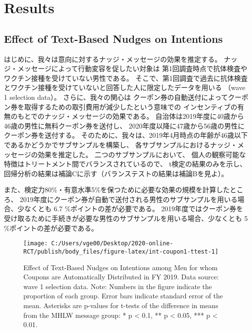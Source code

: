 \documentclass[
  11pt,
  a4paper,
]{article}
\begin{document}
\hypertarget{result}{%
\section{Results}\label{result}}

\hypertarget{intention}{%
\subsection{Effect of Text-Based Nudges on Intentions}\label{intention}}

はじめに、我々は意向に対するナッジ・メッセージの効果を推定する。
ナッジ・メッセージによって行動変容を促したい対象は
第1回調査時点で抗体検査やワクチン接種を受けていない男性である。
そこで、第1回調査で過去に抗体検査とワクチン接種を受けていないと回答した人に限定したデータを用いる
（wave 1 selection data）。
さらに、我々の関心は
クーポン券の自動送付によってクーポン券を取得するための取引費用が減少したという意味での
インセンティブの有無のもとでのナッジ・メッセージの効果である。
自治体は2019年度に40歳から46歳の男性に無料クーポン券を送付し、
2020年度以降に47歳から56歳の男性にクーポン券を送付する。
そのために、我々は、2019年4月時点の年齢が46歳以下であるかどうかでサブサンプルを構築し、
各サブサンプルにおけるナッジ・メッセージの効果を推定した。
二つのサブサンプルにおいて、
個人の観察可能な特徴はトリートメント間でバランスされているので、
t検定の結果のみを示し、回帰分析の結果は補論Cに示す（バランステストの結果は補論Bを見よ）。

また、検定力80\%・有意水準5\%を保つために必要な効果の規模を計算したところ、
2019年度にクーポン券が自動で送付される男性のサブサンプルを用いる場合、少なくとも
6.7
\%ポイントの差が必要である。
2019年度ではクーポン券を受け取るために手続きが必要な男性のサブサンプルを用いる場合、少なくとも
5
\%ポイントの差が必要である。

\begin{figure}[t]
\texttt{[image: C:/Users/vge00/Desktop/2020-online-RCT/publish/body\_files/figure-latex/int-coupon1-ttest-1]} \caption{Effect of Text-Based Nudges on Intentions among Men for whom Coupons are Automatically Distributed in FY 2019. Data source: wave 1 selection data. Note: Numbers in the figure indicate the proportion of each group. Error bars indicate standard error of the mean. Asterisks are p-values for t-tests of the difference in means from the MHLW message group: * p < 0.1, ** p < 0.05, *** p < 0.01.}\label{fig:int-coupon1-ttest}
\end{figure}
\end{document}
